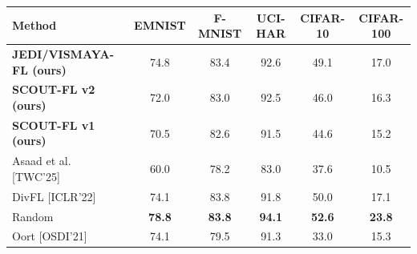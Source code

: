 \begin{tabular}{@{}lccccc@{}}
\toprule
Method & EMNIST & F-MNIST & UCI-HAR & CIFAR-10 & CIFAR-100 \\
\midrule
\textbf{JEDI/VISMAYA-FL (ours)} & 74.8 & 83.4 & 92.6 & 49.1 & 17.0 \\
\textbf{SCOUT-FL v2 (ours)} & 72.0 & 83.0 & 92.5 & 46.0 & 16.3 \\
\textbf{SCOUT-FL v1 (ours)} & 70.5 & 82.6 & 91.5 & 44.6 & 15.2 \\
Asaad et al. [TWC'25] & 60.0 & 78.2 & 83.0 & 37.6 & 10.5 \\
DivFL [ICLR'22] & 74.1 & 83.8 & 91.8 & 50.0 & 17.1 \\
Random & \textbf{78.8} & \textbf{83.8} & \textbf{94.1} & \textbf{52.6} & \textbf{23.8} \\
Oort [OSDI'21] & 74.1 & 79.5 & 91.3 & 33.0 & 15.3 \\
\bottomrule
\end{tabular}